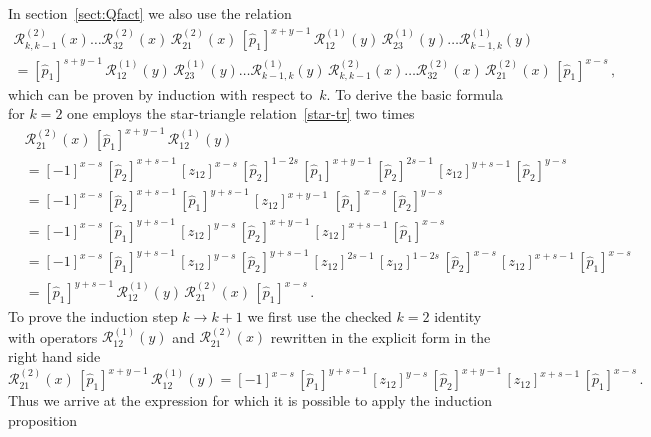 \documentclass[a4paper,11pt]{article}
\numberwithin{equation}{section}
\begin{document}
In section~\ref{sect:Qfact} we also use the relation
\begin{multline} \label{RpR}
	\mathcal{R}^{(2)}_{k,k-1}(x)\dots\mathcal{R}^{(2)}_{32}(x)\,\mathcal{R}^{(2)}_{21}(x)\,[\hat{p}_1]^{x+y-1}\,\mathcal{R}^{(1)}_{12}(y)\,\mathcal{R}^{(1)}_{23}(y)\dots
	\mathcal{R}^{(1)}_{k-1,k}(y) \\
	=
	[\hat{p}_1]^{s+y-1}\,\mathcal{R}^{(1)}_{12}(y)\,\mathcal{R}^{(1)}_{23}(y)\dots
	\mathcal{R}^{(1)}_{k-1,k}(y) \,
	\mathcal{R}^{(2)}_{k,k-1}(x)\dots\mathcal{R}^{(2)}_{32}(x)\,\mathcal{R}^{(2)}_{21}(x)\,[\hat{p}_1]^{x-s} \,,
\end{multline}
which can be proven by induction with respect to~$k$.
To derive the basic formula for $k=2$ one employs the star-triangle relation~\eqref{star-tr} two times
\begin{align}
	& \nonumber
	\mathcal{R}^{(2)}_{21}(x)\,[\hat{p}_1]^{x+y-1}\,\mathcal{R}^{(1)}_{12}(y) \\
	& \nonumber
	= [-1]^{x-s}\,[\hat{p}_2]^{x+s-1}\,[z_{12}]^{x-s}\,[\hat{p}_2]^{1-2s}\,
	[\hat{p}_1]^{x+y-1}\,[\hat{p}_2]^{2s-1}\,[z_{12}]^{y+s-1}\,[\hat{p}_2]^{y-s} \\
	& \nonumber
	= [-1]^{x-s}\,[\hat{p}_2]^{x+s-1}\,[\hat{p}_1]^{y+s-1}\,[z_{12}]^{x+y-1}\,
	\,[\hat{p}_1]^{x-s}\,[\hat{p}_2]^{y-s}
	\\
	& \nonumber
	= [-1]^{x-s}\,[\hat{p}_1]^{y+s-1}\,[z_{12}]^{y-s}\,[\hat{p}_2]^{x+y-1}\,[z_{12}]^{x+s-1}\,[\hat{p}_1]^{x-s} \\
	& \nonumber
	=
	[-1]^{x-s}\,[\hat{p}_1]^{y+s-1}\,[z_{12}]^{y-s}\,[\hat{p}_2]^{y+s-1}\,[z_{12}]^{2s-1}\,[z_{12}]^{1-2s}\,[\hat{p}_2]^{x-s}\,[z_{12}]^{x+s-1}\,[\hat{p}_1]^{x-s} \\
	& \nonumber
	= [\hat{p}_1]^{y+s-1}\,\mathcal{R}^{(1)}_{12}(y)\,\mathcal{R}^{(2)}_{21}(x)\,[\hat{p}_1]^{x-s} \,.
\end{align}
To prove the induction step $k\to k+1$ we first use the checked $k=2$ identity with operators $\mathcal{R}^{(1)}_{12}(y)$ and $\mathcal{R}^{(2)}_{21}(x)$ rewritten in the explicit form in the right hand side
\begin{equation} \nonumber
	\mathcal{R}^{(2)}_{21}(x)\,[\hat{p}_1]^{x+y-1}\,\mathcal{R}^{(1)}_{12}(y) =
	[-1]^{x-s}\,[\hat{p}_1]^{y+s-1}\,[z_{12}]^{y-s}\,[\hat{p}_2]^{x+y-1}\,[z_{12}]^{x+s-1}\,[\hat{p}_1]^{x-s} \,.
\end{equation}
Thus we arrive at the expression for which it is possible to apply the induction proposition
\end{document}
